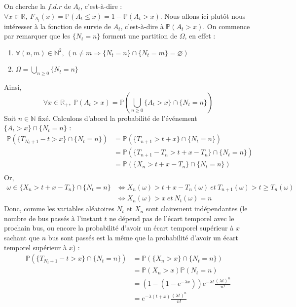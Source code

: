 \documentclass[a4paper, titlepage]{livret} %
\begin{document}
			On cherche la $f.d.r$ de $A_{t}$, c'est-à-dire : $\forall x \in \mathbb{R}, \ F_{A_{t}}(x) = \mathbb{P}(A_{t} \leq x) = 1 - \mathbb{P}(A_{t} > x)$.
			Nous allons ici plutôt nous intéresser à la fonction de survie de $A_{t}$, c'est-à-dire à $\mathbb{P}(A_{t} > x)$.
			On commence par remarquer que les $\{N_{t} = n\}$ forment une partition de $\Omega$, en effet :
			\begin{enumerate}
				\item $\forall (n, m) \in \mathbb{N}^{2}, \ (n \neq m \Rightarrow \{N_{t} = n\} \cap \{N_{t} = m\} = \varnothing)$
				\item $\Omega = \bigcup_{n \geq 0} \{N_{t} = n\}$
			\end{enumerate}
			Ainsi,
			\[
				\forall x \in \mathbb{R}_{+}, \ \mathbb{P}(A_{t} > x) = \mathbb{P}\left(\bigcup_{n \geq 0} \{A_{t} > x\} \cap \{N_{t} = n\}\right)
			\]
			Soit $n \in \mathbb{N}$ fixé. Calculons d'abord la probabilité de l'événement $\{A_{t} > x\} \cap \{N_{t} = n\}$ :
			\[\begin{aligned}
				\mathbb{P}(\{T_{N_{t}+1} - t > x\} \cap \{N_{t} = n\}) & = \mathbb{P}(\{T_{n+1} > t + x\} \cap \{N_{t} = n\})\\
																	   & = \mathbb{P}(\{T_{n+1} - T_{n} > t + x - T_{n}\} \cap \{N_{t} = n\}) \\
																	   & = \mathbb{P}(\{X_{n} > t + x - T_{n}\} \cap \{N_{t} = n\}) \\
			\end{aligned}\]
			Or,
			\[\begin{aligned}
				\omega \in \{X_{n} > t + x - T_{n}\} \cap \{N_{t} = n\} & \Leftrightarrow X_{n}(\omega) > t + x - T_{n}(\omega) \ et \ T_{n+1}(\omega) > t \geq T_{n}(\omega)\\
																		& \Leftrightarrow X_{n}(\omega) > x \ et \ N_{t}(\omega) = n 
			\end{aligned}\]
			Donc, comme les variables aléatoires $N_{t}$ et $X_{n}$ sont clairement indépendantes (le nombre de bus passés à l'instant $t$ ne dépend pas de l'écart temporel avec le prochain bus, ou encore la probabilité d'avoir un écart temporel supérieur à $x$ sachant que $n$ bus sont passés est la même que la probabilité d'avoir un écart temporel supérieur à $x$) :
			\[\begin{aligned}
				\mathbb{P}(\{T_{N_{t}+1} - t > x\} \cap \{N_{t} = n\}) & = \mathbb{P}(\{X_{n} > x\} \cap \{N_{t} = n\}) \\
																	   & = \mathbb{P}(X_{n} > x)\mathbb{P}(N_{t} = n) \\
																	   & = \left(1 - \left(1 - e^{-\lambda x}\right)\right)e^{-\lambda t}\frac{(\lambda t)^{n}}{n!} \\
																	   & = e^{-\lambda (t + x)}\frac{(\lambda t)^{n}}{n!} \\
			\end{aligned}\]
\end{document}

